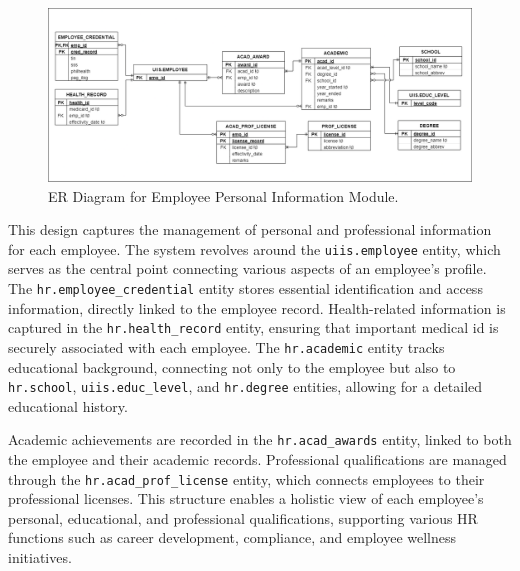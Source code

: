     \begin{figure}[H]
        \centering
        \includegraphics[width=1\linewidth]{figures/images/diagrams/erd/erd-core-emp-personal-info.png}
        \caption{ER Diagram for Employee Personal Information Module.}
        \label{fig:erd-core-emp-personal-info}
    \end{figure}

    This design captures the management of personal and professional information for each employee. The system revolves around the \texttt{uiis.employee} entity, which serves as the central point connecting various aspects of an employee's profile. The \texttt{hr.employee\_credential} entity stores essential identification and access information, directly linked to the employee record. Health-related information is captured in the \texttt{hr.health\_record} entity, ensuring that important medical id is securely associated with each employee. The \texttt{hr.academic} entity tracks educational background, connecting not only to the employee but also to \texttt{hr.school}, \texttt{uiis.educ\_level}, and \texttt{hr.degree} entities, allowing for a detailed educational history. 
            
    Academic achievements are recorded in the \texttt{hr.acad\_awards} entity, linked to both the employee and their academic records. Professional qualifications are managed through the \texttt{hr.acad\_prof\_license} entity, which connects employees to their professional licenses. This structure enables a holistic view of each employee's personal, educational, and professional qualifications, supporting various HR functions such as career development, compliance, and employee wellness initiatives.

